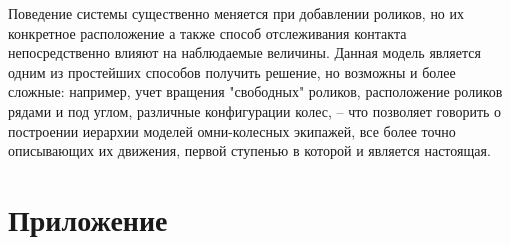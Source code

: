 Поведение системы существенно меняется при добавлении роликов, но их конкретное расположение а также способ отслеживания контакта непосредственно влияют на наблюдаемые величины. Данная модель является одним из простейших способов получить решение, но возможны и более сложные: например, учет вращения "свободных" роликов, расположение роликов рядами и под углом, различные конфигурации колес, -- что позволяет говорить о построении иерархии моделей омни-колесных экипажей, все более точно описывающих их движения, первой ступенью в которой и является настоящая.



\newpage
\section{Приложение}

\newpage




